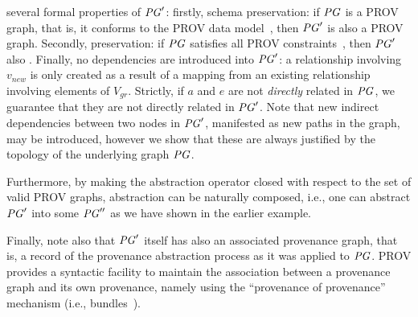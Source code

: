 several formal properties of $\mathit{PG}'$: firstly, schema preservation: if $\mathit{PG}$ is a PROV graph, that is, it conforms to the PROV data model~\citep{w3c-prov-dm}, then $\mathit{PG}'$ is also a PROV graph. Secondly,  preservation: if $\mathit{PG}$  satisfies all PROV constraints~\citep{w3c-prov-dm}, then $\mathit{PG}'$  also . 
 Finally, no   dependencies are introduced into $\mathit{PG}'$: a  relationship involving $v_{new}$ is only created as a result of a mapping from an existing relationship involving elements of $V_{gr}$. Strictly, if $a$ and $e$ are not \textit{directly} related in $\mathit{PG}$, we guarantee that they are not directly related in $\mathit{PG}'$.  Note that new indirect dependencies between two nodes in $\mathit{PG}'$, manifested as new paths in the graph, may be introduced, however we show that these are always justified by the topology of the underlying graph $\mathit{PG}$.

Furthermore, by making the abstraction operator closed with respect to the set of valid PROV graphs, abstraction can be naturally composed, i.e.,  one can abstract $\mathit{PG}'$ into some $\mathit{PG}''$ as we have shown in the earlier example.



%
Finally, note also that $\mathit{PG}'$ itself has also an associated provenance graph, that is, a record of the provenance abstraction process as it was applied to $\mathit{PG}$. 
PROV provides a syntactic facility to maintain the association between a provenance graph and its own provenance, namely using the ``provenance of provenance'' mechanism (i.e., bundles~\citep{w3c-prov-dm}).

 

